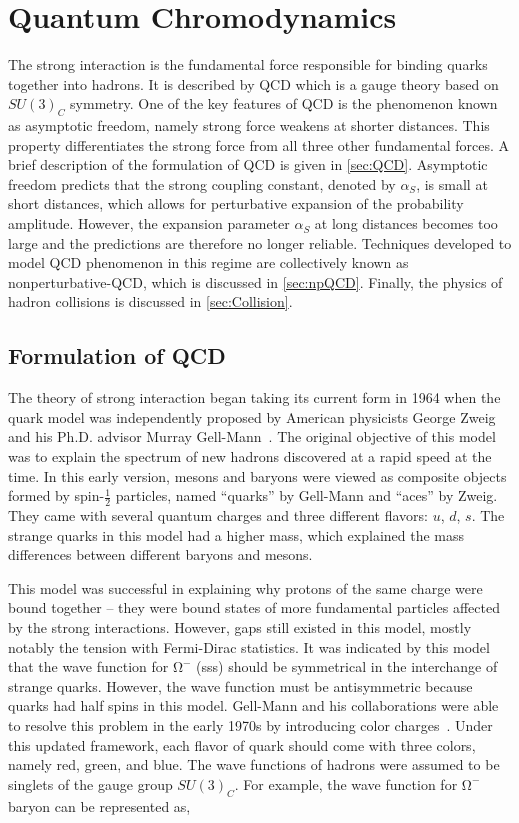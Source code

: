 \chapter{Quantum Chromodynamics}
\label{chap:QCD}

The strong interaction is the fundamental force responsible for binding quarks together into hadrons. It is described by \ac{QCD} which is a gauge theory based on $SU(3)_{C}$ symmetry. One of the key features of \ac{QCD} is the phenomenon known as asymptotic freedom, namely strong force weakens at shorter distances. This property differentiates the strong force from all three other fundamental forces. A brief description of the formulation of \ac{QCD} is given in \autoref{sec:QCD}. Asymptotic freedom predicts that the strong coupling constant, denoted by $\alpha_{S}$, is small at short distances, which allows for perturbative expansion of the probability amplitude. However, the expansion parameter $\alpha_{S}$ at long distances becomes too large and the predictions are therefore no longer reliable. Techniques developed to model \ac{QCD} phenomenon in this regime are collectively known as nonperturbative-\ac{QCD}, which is discussed in \autoref{sec:npQCD}. Finally, the physics of hadron collisions is discussed in \autoref{sec:Collision}.

\section{Formulation of QCD}
\label{sec:QCD}

The theory of strong interaction began taking its current form in 1964 when the quark model was independently proposed by American physicists George Zweig~\cite{Zweig:1964ruk} and his Ph.D. advisor Murray Gell-Mann~\cite{Gell-Mann:1964ewy}. The original objective of this model was to explain the spectrum of new hadrons discovered at a rapid speed at the time. In this early version, mesons and baryons were viewed as composite objects formed by spin-$\frac{1}{2}$ particles, named ``quarks'' by Gell-Mann and ``aces'' by Zweig. They came with several quantum charges and three different flavors: $u$, $d$, $s$. The strange quarks in this model had a higher mass, which explained the mass differences between different baryons and mesons.

This model was successful in explaining why protons of the same charge were bound together -- they were bound states of more fundamental particles affected by the strong interactions. However, gaps still existed in this model, mostly notably the tension with Fermi-Dirac statistics. It was indicated by this model that the wave function for $\mathrm{\Omega^{-}}$ (sss) should be symmetrical in the interchange of strange quarks. However, the wave function must be antisymmetric because quarks had half spins in this model. Gell-Mann and his collaborations were able to resolve this problem in the early 1970s by introducing color charges~\cite{Fritzsch:1973pi}. Under this updated framework, each flavor of quark should come with three colors, namely red, green, and blue. The wave functions of hadrons were assumed to be singlets of the gauge group $SU(3)_{C}$. For example, the wave function for $\mathrm{\Omega^{-}}$ baryon can be represented as,

